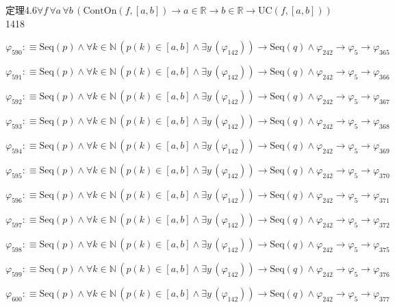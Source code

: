 \begin{fullproof}{定理4.6}{$\forall f\,\forall a\,\forall b\,(\mathrm{ContOn}(f,[a,b]) \to a \in \mathbb{R} \to b \in \mathbb{R} \to \mathrm{UC}(f,[a,b]))$}{1418}
\begin{abbrevlist}
\item $\varphi_{590} :\equiv \mathrm{Seq}(p) \land \forall k \in \mathbb{N}\,(p(k) \in [a,b] \land \exists y\,(\varphi_{142})) \to \mathrm{Seq}(q) \land \varphi_{242} \to \varphi_{5} \to \varphi_{365}$
\item $\varphi_{591} :\equiv \mathrm{Seq}(p) \land \forall k \in \mathbb{N}\,(p(k) \in [a,b] \land \exists y\,(\varphi_{142})) \to \mathrm{Seq}(q) \land \varphi_{242} \to \varphi_{5} \to \varphi_{366}$
\item $\varphi_{592} :\equiv \mathrm{Seq}(p) \land \forall k \in \mathbb{N}\,(p(k) \in [a,b] \land \exists y\,(\varphi_{142})) \to \mathrm{Seq}(q) \land \varphi_{242} \to \varphi_{5} \to \varphi_{367}$
\item $\varphi_{593} :\equiv \mathrm{Seq}(p) \land \forall k \in \mathbb{N}\,(p(k) \in [a,b] \land \exists y\,(\varphi_{142})) \to \mathrm{Seq}(q) \land \varphi_{242} \to \varphi_{5} \to \varphi_{368}$
\item $\varphi_{594} :\equiv \mathrm{Seq}(p) \land \forall k \in \mathbb{N}\,(p(k) \in [a,b] \land \exists y\,(\varphi_{142})) \to \mathrm{Seq}(q) \land \varphi_{242} \to \varphi_{5} \to \varphi_{369}$
\item $\varphi_{595} :\equiv \mathrm{Seq}(p) \land \forall k \in \mathbb{N}\,(p(k) \in [a,b] \land \exists y\,(\varphi_{142})) \to \mathrm{Seq}(q) \land \varphi_{242} \to \varphi_{5} \to \varphi_{370}$
\item $\varphi_{596} :\equiv \mathrm{Seq}(p) \land \forall k \in \mathbb{N}\,(p(k) \in [a,b] \land \exists y\,(\varphi_{142})) \to \mathrm{Seq}(q) \land \varphi_{242} \to \varphi_{5} \to \varphi_{371}$
\item $\varphi_{597} :\equiv \mathrm{Seq}(p) \land \forall k \in \mathbb{N}\,(p(k) \in [a,b] \land \exists y\,(\varphi_{142})) \to \mathrm{Seq}(q) \land \varphi_{242} \to \varphi_{5} \to \varphi_{372}$
\item $\varphi_{598} :\equiv \mathrm{Seq}(p) \land \forall k \in \mathbb{N}\,(p(k) \in [a,b] \land \exists y\,(\varphi_{142})) \to \mathrm{Seq}(q) \land \varphi_{242} \to \varphi_{5} \to \varphi_{375}$
\item $\varphi_{599} :\equiv \mathrm{Seq}(p) \land \forall k \in \mathbb{N}\,(p(k) \in [a,b] \land \exists y\,(\varphi_{142})) \to \mathrm{Seq}(q) \land \varphi_{242} \to \varphi_{5} \to \varphi_{376}$
\item $\varphi_{600} :\equiv \mathrm{Seq}(p) \land \forall k \in \mathbb{N}\,(p(k) \in [a,b] \land \exists y\,(\varphi_{142})) \to \mathrm{Seq}(q) \land \varphi_{242} \to \varphi_{5} \to \varphi_{377}$

\end{abbrevlist}
\end{fullproof}
